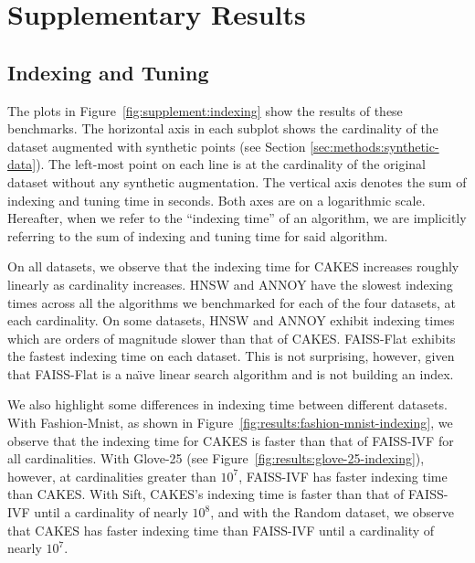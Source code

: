 \documentclass[review,supplement,onefignum,onetabnum]{siamonline220329}
\begin{document}
\ifpdf
{}
\fi


\maketitle


\section{Supplementary Results}

\subsection{Indexing and Tuning}

The plots in Figure~\ref{fig:supplement:indexing} show the results of these benchmarks.
The horizontal axis in each subplot shows the cardinality of the dataset augmented with synthetic points (see Section \ref{sec:methods:synthetic-data}).
The left-most point on each line is at the cardinality of the original dataset without any synthetic augmentation.
The vertical axis denotes the sum of indexing and tuning time in seconds.
Both axes are on a logarithmic scale.
Hereafter, when we refer to the ``indexing time'' of an algorithm, we are implicitly referring to the sum of indexing and tuning time for said algorithm.

On all datasets, we observe that the indexing time for CAKES increases roughly linearly as cardinality increases.
HNSW and ANNOY have the slowest indexing times across all the algorithms we benchmarked for each of the four datasets, at each cardinality. 
On some datasets, HNSW and ANNOY exhibit indexing times which are orders of magnitude slower than that of CAKES.
FAISS-Flat exhibits the fastest indexing time on each dataset. 
This is not surprising, however, given that FAISS-Flat is a na\"{\i}ve linear search algorithm and is not building an index.

We also highlight some differences in indexing time between different datasets.
With Fashion-Mnist, as shown in Figure~\ref{fig:results:fashion-mnist-indexing}, we observe that the indexing time for CAKES is faster than that of FAISS-IVF for all cardinalities.
With Glove-25 (see Figure~\ref{fig:results:glove-25-indexing}), however, at cardinalities greater than $10^7$, FAISS-IVF has faster indexing time than CAKES.
With Sift, CAKES's indexing time is faster than that of FAISS-IVF until a cardinality of nearly $10^8$, and with the Random dataset, we observe that CAKES has faster indexing time than FAISS-IVF until a cardinality of nearly $10^7$.
\end{document}

